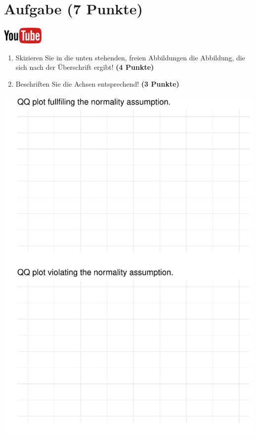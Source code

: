 \documentclass[a4paper, 10pt]{scrartcl}\usepackage[]{graphicx}\usepackage[]{xcolor}
\makeatletter
\def\maxwidth{ %
  \ifdim\Gin@nat@width>\linewidth
    \linewidth
  \else
    \Gin@nat@width
  \fi
}
\makeatother
\begin{document}
 
\clearpage

\section{Aufgabe \hfill (7 Punkte)}

\hfill\href{https://youtu.be/cYyvOXR4qa8}{\includegraphics[width =
  2cm]{img/youtube}}\\[1Ex]




\begin{enumerate}
\item Skizieren Sie in die unten stehenden, freien Abbildungen die
  Abbildung, die sich nach der {\"U}berschrift ergibt! \textbf{(4 Punkte)}
\item Beschriften Sie die Achsen entsprechend! \textbf{(3 Punkte)}
\end{enumerate}



{\centering \includegraphics[width=\maxwidth]{img/regression-04-1} 

}
\end{document}
